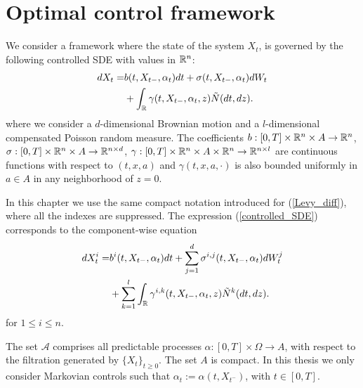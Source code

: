 \section{Optimal control framework}\label{Optimal_control_framework}

We consider a framework where the state of the system $X_t$, is governed by the following controlled SDE with values in $\mathbb{R}^n$:
\begin{align}\label{controlled_SDE}
 dX_t =& b(t,X_{t-},\alpha_t) dt + \sigma (t,X_{t-},\alpha_t) dW_t \\ \nonumber
      &+ \int_{\mathbb{R}} \gamma(t,X_{t-},\alpha_t,z) \tilde N(dt,dz).
\end{align}
where we consider a $d$-dimensional Brownian motion and a $l$-dimensional compensated Poisson random measure. 
The coefficients $b: [0,T]\times \mathbb{R}^n \times A \to \mathbb{R}^n$, $\sigma: [0,T]\times \mathbb{R}^n \times A \to \mathbb{R}^{n \times d}$, 
$\gamma: [0,T]\times \mathbb{R}^n \times A \times \mathbb{R}^n \to \mathbb{R}^{n \times l}$ are continuous functions with respect to $(t,x,a)$ and $\gamma(t,x,a,\cdot)$ is also bounded
uniformly in $a \in A$ in any neighborhood of $z=0$. 

In this chapter we use the same compact notation introduced for (\ref{Levy_diff}), where all the indexes are suppressed. The expression (\ref{controlled_SDE}) corresponds to the 
component-wise equation 
\begin{align}
 dX^i_t =& b^i(t,X_{t-},\alpha_t) dt + \sum_{j=1}^d \sigma^{i,j} (t,X_{t-},\alpha_t) dW^j_t \\ \nonumber
      &+ \sum_{k=1}^l \int_{\mathbb{R}} \gamma^{i,k}(t,X_{t-},\alpha_t,z) \tilde N^k(dt,dz).
\end{align}
for $1 \leq i \leq n$.

The set $\mathcal{A}$ comprises all predictable processes $\alpha: [0,T]\times \Omega \to  A$, with respect to the filtration generated by $\{X_t\}_{t\geq 0}$.
The set $A$ is compact.
In this thesis we only consider Markovian controls such that $\alpha_t := \alpha(t,X_{t^-}) $, with $t\in [0,T]$.

